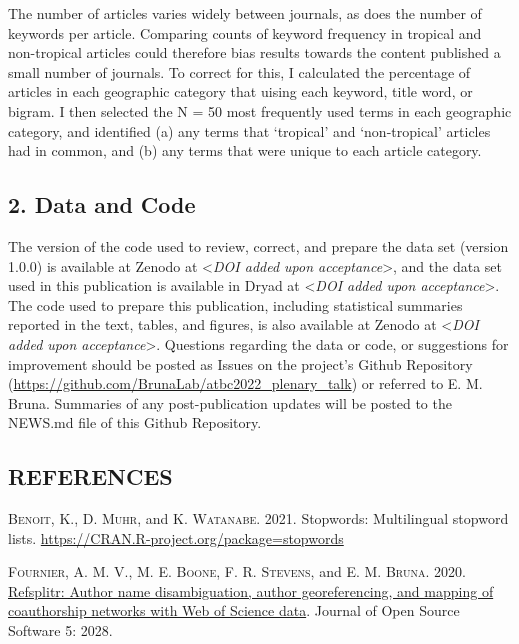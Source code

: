 \documentclass[
  12pt,
  man, donotrepeattitle,floatsintext]{apa6}
\begin{document}
The number of articles varies widely between journals, as does the number of keywords per article. Comparing counts of keyword frequency in tropical and non-tropical articles could therefore bias results towards the content published a small number of journals. To correct for this, I calculated the percentage of articles in each geographic category that uising each keyword, title word, or bigram. I then selected the N = 50 most frequently used terms in each geographic category, and identified (a) any terms that `tropical' and `non-tropical' articles had in common, and (b) any terms that were unique to each article category.

\hypertarget{data-and-code}{%
\subsection{2. Data and Code}\label{data-and-code}}

\noindent The version of the code used to review, correct, and prepare the data set (version 1.0.0) is available at Zenodo at \textless{}\emph{DOI added upon acceptance}\textgreater, and the data set used in this publication is available in Dryad at \textless{}\emph{DOI added upon acceptance}\textgreater. The code used to prepare this publication, including statistical summaries reported in the text, tables, and figures, is also available at Zenodo at \textless{}\emph{DOI added upon acceptance}\textgreater. Questions regarding the data or code, or suggestions for improvement should be posted as Issues on the project's Github Repository (\url{https://github.com/BrunaLab/atbc2022_plenary_talk}) or referred to E. M. Bruna. Summaries of any post-publication updates will be posted to the NEWS.md file of this Github Repository.

\hypertarget{references-1}{%
\subsection{REFERENCES}\label{references-1}}

\textsc{Benoit, K.}, \textsc{D. Muhr}, and \textsc{K. Watanabe}. 2021. Stopwords: Multilingual stopword lists. \url{https://CRAN.R-project.org/package=stopwords}

\textsc{Fournier, A. M. V.}, \textsc{M. E. Boone}, \textsc{F. R. Stevens}, and \textsc{E. M. Bruna}. 2020. \href{https://doi.org/10.21105/joss.02028}{Refsplitr: Author name disambiguation, author georeferencing, and mapping of coauthorship networks with Web of Science data}. Journal of Open Source Software 5: 2028.
\end{document}
